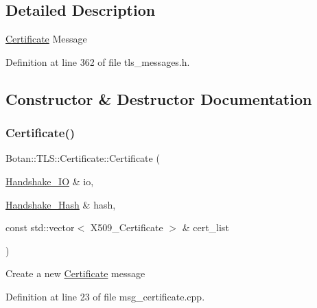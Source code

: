 \subsection{Detailed Description}
\mbox{\hyperlink{class_botan_1_1_t_l_s_1_1_certificate}{Certificate}} Message 

Definition at line 362 of file tls\+\_\+messages.\+h.



\subsection{Constructor \& Destructor Documentation}
\mbox{\label{class_botan_1_1_t_l_s_1_1_certificate_a115ec120b433f9572103ecf40833b32c}} 
\subsubsection{\texorpdfstring{Certificate()}{Certificate()}\hspace{0.1cm}{\footnotesize\ttfamily [1/2]}}
{\footnotesize\ttfamily Botan\+::\+T\+L\+S\+::\+Certificate\+::\+Certificate (\begin{DoxyParamCaption}\item[{\mbox{\hyperlink{class_botan_1_1_t_l_s_1_1_handshake___i_o}{Handshake\+\_\+\+IO}} \&}]{io,  }\item[{\mbox{\hyperlink{class_botan_1_1_t_l_s_1_1_handshake___hash}{Handshake\+\_\+\+Hash}} \&}]{hash,  }\item[{const std\+::vector$<$ X509\+\_\+\+Certificate $>$ \&}]{cert\+\_\+list }\end{DoxyParamCaption})}

Create a new \mbox{\hyperlink{class_botan_1_1_t_l_s_1_1_certificate}{Certificate}} message 

Definition at line 23 of file msg\+\_\+certificate.\+cpp.

\mbox{\label{class_botan_1_1_t_l_s_1_1_certificate_a2000a5fbaabfa453f0fe94daea1af96b}} 
